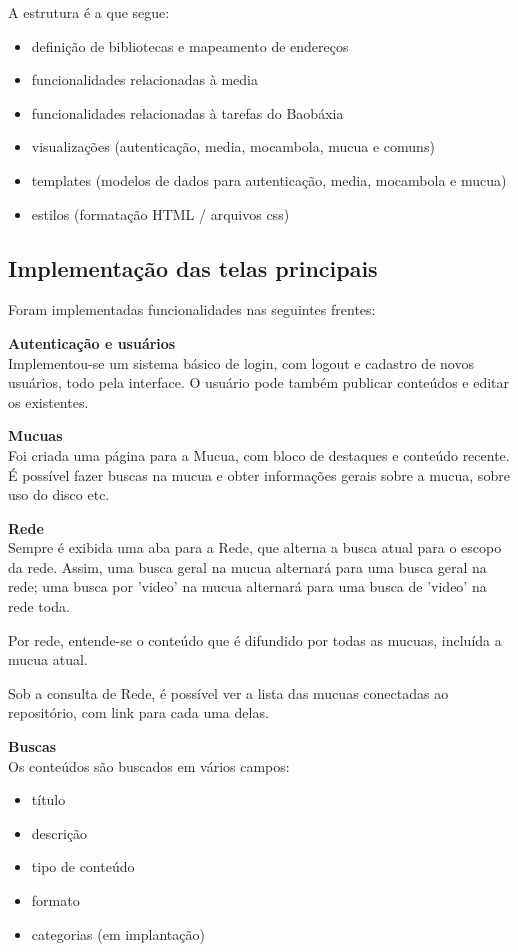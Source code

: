 A estrutura é a que segue:
\begin{itemize}
  \item definição de bibliotecas e mapeamento de endereços
  \item funcionalidades relacionadas à media
  \item funcionalidades relacionadas à tarefas do Baobáxia
  \item visualizações (autenticação, media, mocambola, mucua e comuns)
  \item templates (modelos de dados para autenticação, media, mocambola e mucua)
  \item estilos (formatação HTML / arquivos css)
\end{itemize}

\subsection{Implementação das telas principais}
Foram implementadas funcionalidades nas seguintes frentes:

\textbf{Autenticação e usuários}\\

Implementou-se um sistema básico de login, com logout e cadastro de novos
usuários, todo pela interface. O usuário pode também publicar conteúdos e
editar os existentes.

\textbf{Mucuas}\\

Foi criada uma página para a Mucua, com bloco de destaques e conteúdo recente.
É possível fazer buscas na mucua e obter informações gerais sobre a mucua,
sobre uso do disco etc.

\textbf{Rede}\\

Sempre é exibida uma aba para a Rede, que alterna a busca atual para o escopo
da rede. Assim, uma busca geral na mucua alternará para uma busca geral na rede;
uma busca por 'video' na mucua alternará para uma busca de 'video' na rede toda.

Por rede, entende-se o conteúdo que é difundido por todas as mucuas, incluída a
mucua atual.

Sob a consulta de Rede, é possível ver a lista das mucuas conectadas ao
repositório, com link para cada uma delas.

\textbf{Buscas}\\

Os conteúdos são buscados em vários campos:

\begin{itemize}
  \item título
  \item descrição
  \item tipo de conteúdo
  \item formato
  \item categorias (em implantação)    
\end{itemize}

